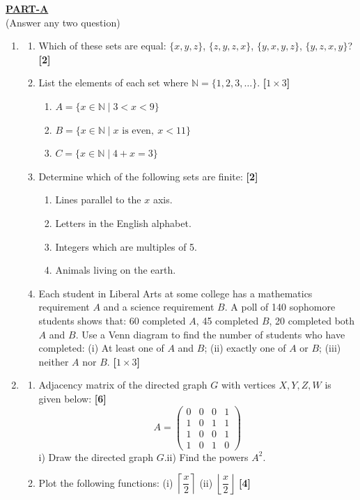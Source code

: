 \documentclass[11pt,a4paper]{article}
\newcommand{\mk}[1]{\hfill\textbf{[#1]}}
\renewcommand{\partname}[2]{\begin{center}\textbf{\underline{#1}}\\[-1pt]{\small #2}\end{center}}
\newenvironment{Ql}{\begin{enumerate}[leftmargin=2.5em,labelsep=0.4em,itemsep=5pt,topsep=2pt]}{\end{enumerate}}
\newenvironment{Sl}{\begin{enumerate}[leftmargin=2.3em,labelsep=0.3em,itemsep=3pt,topsep=2pt]}{\end{enumerate}}
\newenvironment{Rl}{\begin{enumerate}[leftmargin=2.2em,labelsep=0.3em,itemsep=1pt,topsep=1pt]}{\end{enumerate}}
\begin{document}
\partname{PART-A}{(Answer any two question)}
\begin{Ql}
\item[\textbf{1)}]
 \begin{Sl}
 \item[a)] Which of these sets are equal: $\{x,y,z\}$, $\{z,y,z,x\}$, $\{y,x,y,z\}$, $\{y,z,x,y\}$? \mk{2}
 \item[b)] List the elements of each set where $\mathbb N=\{1,2,3,\dots\}$. \mk{$1\times3$}
  \begin{Rl}
  \item[(i)] $A=\{x\in\mathbb N \mid 3<x<9\}$
  \item[(ii)] $B=\{x\in\mathbb N \mid x \text{ is even},\ x<11\}$
  \item[(iii)] $C=\{x\in\mathbb N \mid 4+x=3\}$
  \end{Rl}
 \item[c)] Determine which of the following sets are finite: \mk{2}
  \begin{Rl}
  \item[(i)] Lines parallel to the $x$ axis.
  \item[(ii)] Letters in the English alphabet.
  \item[(iii)] Integers which are multiples of 5.
  \item[(iv)] Animals living on the earth.
  \end{Rl}
 \item[d)] Each student in Liberal Arts at some college has a mathematics requirement $A$ and a science requirement $B$. A poll of 140 sophomore students shows that: 60 completed $A$, 45 completed $B$, 20 completed both $A$ and $B$. Use a Venn diagram to find the number of students who have completed: (i) At least one of $A$ and $B$; (ii) exactly one of $A$ or $B$; (iii) neither $A$ nor $B$. \mk{$1\times3$}
 \end{Sl}
\item[\textbf{2)}]
 \begin{Sl}
 \item[(a)] Adjacency matrix of the directed graph $G$ with vertices $X,Y,Z,W$ is given below: \mk{6}
  \[A=\begin{pmatrix}0&0&0&1\\1&0&1&1\\1&0&0&1\\1&0&1&0\end{pmatrix}\]
  i) Draw the directed graph $G$.\quad ii) Find the powers $A^2$.
 \item[(b)] Plot the following functions: (i) $\left\lceil \dfrac{x}{2}\right\rceil$ \quad (ii) $\left\lfloor \dfrac{x}{2}\right\rfloor$ \mk{4}

\end{Sl}
\end{Ql}
\end{document}

